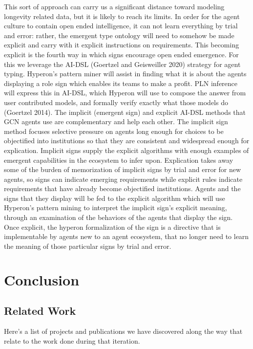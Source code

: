 \documentclass[]{report}
\begin{document}
This sort of approach can carry us a significant distance toward
modeling longevity related data, but it is likely to reach its
limits. In order for the agent culture to contain open ended
intelligence, it can not learn everything by trial and error: rather,
the emergent type ontology will need to somehow be made explicit and
carry with it explicit instructions on requirements. This becoming
explicit is the fourth way in which signs encourage open ended
emergence. For this we leverage the AI-DSL (Goertzel and Geisweiller
2020) strategy for agent typing. Hyperon’s pattern miner will assist
in finding what it is about the agents displaying a role sign which
enables its teams to make a profit. PLN inference will express this in
AI-DSL, which Hyperon will use to compose the answer from user
contributed models, and formally verify exactly what those models do
(Goertzel 2014).  The implicit (emergent sign) and explicit AI-DSL
methods that GCN agents use are complementary and help each other. The
implicit sign method focuses selective pressure on agents long enough
for choices to be objectified into institutions so that they are
consistent and widespread enough for explication. Implicit signs
supply the explicit algorithms with enough examples of emergent
capabilities in the ecosystem to infer upon. Explication takes away
some of the burden of memorization of implicit signs by trial and
error for new agents, so signs can indicate emerging requirements
while explicit rules indicate requirements that have already become
objectified institutions. Agents and the signs that they display will
be fed to the explicit algorithm which will use Hyperon's pattern
mining to interpret the implicit sign's explicit meaning, through an
examination of the behaviors of the agents that display the sign. Once
explicit, the hyperon formalization of the sign is a directive that is
implementable by agents new to an agent ecosystem, that no longer need
to learn the meaning of those particular signs by trial and error.

\chapter{Conclusion}

\section{Related Work}

Here's a list of projects and publications we have discovered along
the way that relate to the work done during that iteration.
\end{document}
